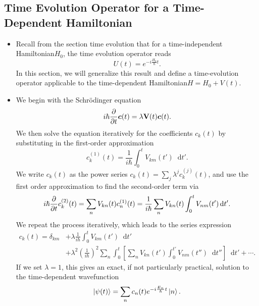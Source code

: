 \documentclass[11pt, a4paper]{article}
\newcommand{\diff}{\mathop{}\!\mathrm{d}} %
\newcommand{\Schro}{Schr\"{o}dinger\xspace}
\newcommand{\Ham}{Hamiltonian\xspace}
\renewcommand{\vec}[1]{\bm{#1}}  %
\newcommand{\mat}[1]{\mathbf{#1}}  %
\begin{document}
\subsection{Time Evolution Operator for a Time-Dependent \Ham}
\begin{itemize}
    \item Recall from the section time evolution that for a time-independent \Ham $ H_{0} $, the time evolution operator reads
    \begin{equation*}
        U(t) = e^{-i \frac{H_{0}}{\hbar}t}.
    \end{equation*}
    In this section, we will generalize this result and define a time-evolution operator applicable to the time-dependent \Ham $ H = H_{0} + V(t) $. 

    \item We begin with the \Schro equation 
    \begin{equation*}
        i \hbar \pdv{t} \vec{c}(t) = \lambda \mat{V}(t) \vec{c}(t).
    \end{equation*}
    We then solve the equation iteratively for the coefficients $ c_{k}(t) $ by substituting in the first-order approximation
    \begin{equation*}
        c_{k}^{(1)}(t) = \frac{1}{i \hbar} \int_{0}^{t}V_{km}(t')\diff t'.
    \end{equation*}
    We write $ c_{k}(t) $ as the power series $ c_{k}(t) = \sum_{j}\lambda^{j}c_{k}^{(j)}(t) $, and use the first order approximation to find the second-order term via
    \begin{equation*}
        i \hbar \pdv{t} c_{k}^{(2)}(t) = \sum_{n} V_{kn} (t) c_{n}^{(1)}(t) = \frac{1}{i \hbar}\sum_{n}V_{kn}(t)\int_{0}^{t}V_{nm}(t')\diff t'.
    \end{equation*}
    We repeat the process iteratively, which leads to the series expression
    \begin{align*}
        c_{k}(t) = \delta_{km} &+ \lambda \frac{1}{ i \hbar} \int_{0}^{t} V_{km}(t')\diff t'\\
        & + \lambda^{2} \left( \frac{1}{i \hbar} \right)^{2} \sum_{n}\int_{0}^{t} \left[ \sum_{n} V_{kn}(t') \int_{0}^{t'} V_{nm}(t'')\diff t'' \right]\diff t' + \cdots.
    \end{align*}
    If we set $ \lambda = 1 $, this gives an exact, if not particularly practical, solution to the time-dependent wavefunction
    \begin{equation*}
        \ket{\psi(t)} = \sum_{n}c_{n}(t)e^{-i \frac{E_{n}}{\hbar}t}\ket{n}.
    \end{equation*}
    

\end{itemize}
\end{document}
